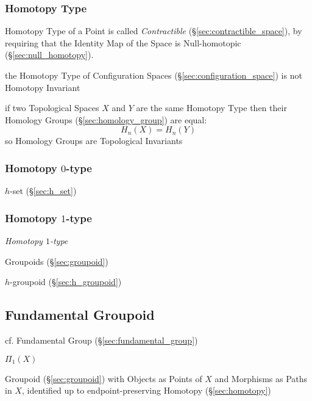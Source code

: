 \subsubsection{Homotopy Type}\label{sec:homotopy_type}

Homotopy Type of a Point is called \emph{Contractible}
(\S\ref{sec:contractible_space}), by requiring that the Identity Map
of the Space is Null-homotopic (\S\ref{sec:null_homotopy}).

the Homotopy Type of Configuration Spaces (\S\ref{sec:configuration_space}) is
not Homotopy Invariant

if two Topological Spaces $X$ and $Y$ are the same Homotopy Type then their
Homology Groups (\S\ref{sec:homology_group}) are equal:
\[
  H_n(X) = H_n(Y)
\]
so Homology Groups are Topological Invariants



\subsubsection{Homotopy $0$-type}\label{sec:homotopy_0type}

$h$-set (\S\ref{sec:h_set})



\subsubsection{Homotopy $1$-type}\label{sec:homotopy_1type}

\emph{Homotopy $1$-type}

Groupoids (\S\ref{sec:groupoid})

$h$-groupoid (\S\ref{sec:h_groupoid})



\subsection{Fundamental Groupoid}\label{sec:fundamental_groupoid}

cf. Fundamental Group (\S\ref{sec:fundamental_group})

$\Pi_1(X)$

Groupoid (\S\ref{sec:groupoid}) with Objects as Points of $X$ and Morphisms as
Paths in $X$, identified up to endpoint-preserving Homotopy
(\S\ref{sec:homotopy})



